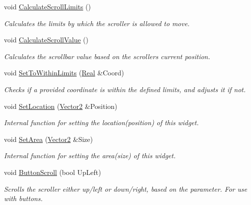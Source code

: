 \begin{DoxyCompactItemize}
void \hyperlink{classphys_1_1UI_1_1Scrollbar_aa59e2c0662ac13fac037164c86f829f5}{CalculateScrollLimits} ()
\begin{DoxyCompactList}\small\item\em Calculates the limits by which the scroller is allowed to move. \item\end{DoxyCompactList}\item 
void \hyperlink{classphys_1_1UI_1_1Scrollbar_afc9eb290c8dcf3935e2b3046063989e9}{CalculateScrollValue} ()
\begin{DoxyCompactList}\small\item\em Calculates the scrollbar value based on the scrollers current position. \item\end{DoxyCompactList}\item 
void \hyperlink{classphys_1_1UI_1_1Scrollbar_a2048345c29ba15b8820971492f2bdea1}{SetToWithinLimits} (\hyperlink{namespacephys_af7eb897198d265b8e868f45240230d5f}{Real} \&Coord)
\begin{DoxyCompactList}\small\item\em Checks if a provided coordinate is within the defined limits, and adjusts it if not. \item\end{DoxyCompactList}\item 
void \hyperlink{classphys_1_1UI_1_1Scrollbar_a3293265621c49afcd9529f0ca8fb7209}{SetLocation} (\hyperlink{classphys_1_1Vector2}{Vector2} \&Position)
\begin{DoxyCompactList}\small\item\em Internal function for setting the location(position) of this widget. \item\end{DoxyCompactList}\item 
void \hyperlink{classphys_1_1UI_1_1Scrollbar_a7a5bbde7202248b3c094543c1fce3705}{SetArea} (\hyperlink{classphys_1_1Vector2}{Vector2} \&Size)
\begin{DoxyCompactList}\small\item\em Internal function for setting the area(size) of this widget. \item\end{DoxyCompactList}\item 
void \hyperlink{classphys_1_1UI_1_1Scrollbar_a31a2e11f27f087154fd61d7cc2cd6dc1}{ButtonScroll} (bool UpLeft)
\begin{DoxyCompactList}\small\item\em Scrolls the scroller either up/left or down/right, based on the parameter. For use with buttons. \item\end{DoxyCompactList}\item 

\end{DoxyCompactItemize}
